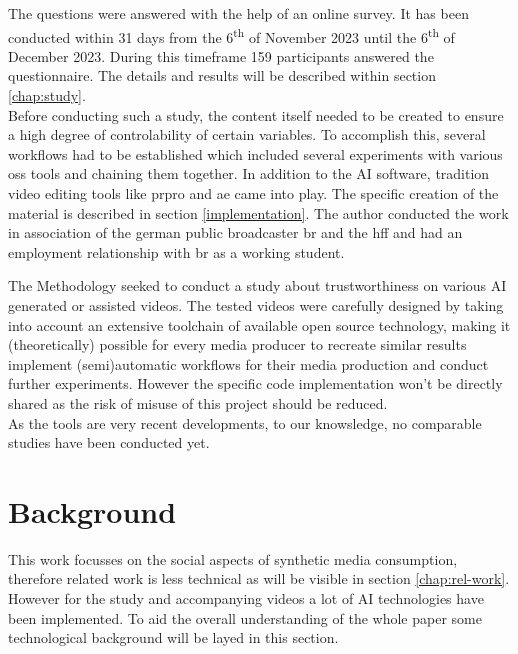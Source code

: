 \documentclass[
  a4paper,  %
  twoside,  %
  bibliography=totoc,
  headsepline,
  cleardoublepage=empty,
  parskip=half,
  draft=false
]{scrbook}
\begin{document}
The questions were answered with the help of an online survey. It has been conducted within 31 days from the 6\textsuperscript{th} of November 2023 until the 6\textsuperscript{th} of December 2023. During this timeframe 159 participants answered the questionnaire. The details and results will be described within section \ref{chap:study}. \\
Before conducting such a study, the content itself needed to be created to ensure a high degree of controlability of certain variables. To accomplish this, several workflows had to be established which included several experiments with various \gls{oss} tools and chaining them together. In addition to the AI software, tradition video editing tools like \gls{prpro} and \gls{ae} came into play. The specific creation of the material is described in section \ref{implementation}. The author conducted the work in association of the german public broadcaster \gls{br} and the \gls{hff} and had an employment relationship with \gls{br} as a working student.

The Methodology seeked to conduct a study about trustworthiness on various AI generated or assisted videos.
The tested videos were carefully designed by taking into account an extensive toolchain of available open source technology, making it (theoretically) possible for every media producer to recreate similar results implement (semi)automatic workflows for their media production and conduct further experiments. However the specific code implementation won't be directly shared as the risk of misuse of this project should be reduced. \\
As the tools are very recent developments, to our knowsledge, no comparable studies have been conducted yet.


\chapter{Background}
\label{chap:background}

This work focusses on the social aspects of synthetic media consumption, therefore related work is less technical as will be visible in section \ref{chap:rel-work}. However for the study and accompanying videos a lot of AI technologies have been implemented. To aid the overall understanding of the whole paper some technological background will be layed in this section.
\end{document}
